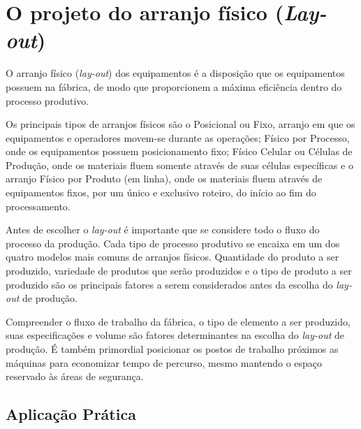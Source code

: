 \chapter{O projeto do arranjo físico (\textit{Lay-out})}
\label{chap:projeto_do_arranjo}
O arranjo físico (\textit{lay-out}) dos equipamentos é a disposição que os equipamentos possuem na fábrica, de modo que proporcionem a máxima eficiência dentro do processo produtivo.

Os principais tipos de arranjos físicos são o Posicional ou Fixo, arranjo em que os equipamentos e operadores movem-se durante as operações; Físico por Processo, onde os equipamentos possuem posicionamento fixo; Físico Celular ou Células de Produção, onde os materiais fluem somente através de suas células específicas e o arranjo Físico por Produto (em linha), onde os materiais fluem através de equipamentos fixos, por um único e exclusivo roteiro, do início ao fim do processamento.

Antes de escolher o \textit{lay-out} é importante que se considere todo o fluxo do processo da produção. Cada tipo de processo produtivo se encaixa em um dos quatro modelos mais comuns de arranjos físicos. Quantidade do produto a ser produzido, variedade de produtos que serão produzidos e o tipo de produto a ser produzido são os principais fatores a serem considerados antes da escolha do \textit{lay-out} de produção.

Compreender o fluxo de trabalho da fábrica, o tipo de elemento a ser produzido, suas especificações e volume são fatores determinantes na escolha do \textit{lay-out} de produção. É também primordial posicionar os postos de trabalho próximos as máquinas para economizar tempo de percurso, mesmo mantendo o espaço reservado às áreas de segurança.

\section{Aplicação Prática}
\label{sec:projeto_do_arranjo_aplicacao}